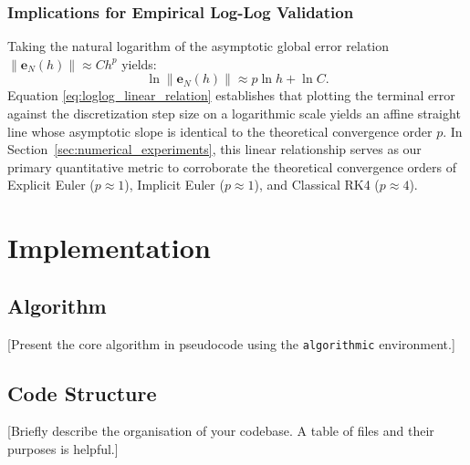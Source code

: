\documentclass[11pt,a4paper]{article}
\theoremstyle{definition}
\theoremstyle{remark}
\begin{document}
\subsubsection{Implications for Empirical Log-Log Validation}
Taking the natural logarithm of the asymptotic global error relation $\|\mathbf{e}_N(h)\| \approx C h^p$ yields:
\begin{equation}
\label{eq:loglog_linear_relation}
\ln \|\mathbf{e}_N(h)\| \approx p \ln h + \ln C.
\end{equation}
Equation \eqref{eq:loglog_linear_relation} establishes that plotting the terminal error against the discretization step size on a logarithmic scale yields an affine straight line whose asymptotic slope is identical to the theoretical convergence order $p$. In Section~\ref{sec:numerical_experiments}, this linear relationship serves as our primary quantitative metric to corroborate the theoretical convergence orders of Explicit Euler ($p \approx 1$), Implicit Euler ($p \approx 1$), and Classical RK4 ($p \approx 4$).

\newpage
\section{Implementation}

\subsection{Algorithm}
[Present the core algorithm in pseudocode using the \texttt{algorithmic}
environment.]

\begin{algorithm}[H]
\caption{[Your method name]}
\label{alg:main}
\begin{algorithmic}[1]
\State [Step 1]
    \If{[condition]}
        \State [Action]
    \EndIf
\EndFor
\State \Return [result]
\end{algorithmic}
\end{algorithm}

\subsection{Code Structure}
[Briefly describe the organisation of your codebase. A table of files and their
purposes is helpful.]
\end{document}
